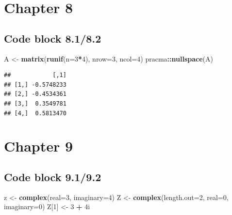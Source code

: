 \documentclass[
]{book}
\newenvironment{Shaded}{\begin{snugshade}}{\end{snugshade}}
\newcommand{\DataTypeTok}[1]{\textcolor[rgb]{0.13,0.29,0.53}{#1}}
\newcommand{\DecValTok}[1]{\textcolor[rgb]{0.00,0.00,0.81}{#1}}
\newcommand{\KeywordTok}[1]{\textcolor[rgb]{0.13,0.29,0.53}{\textbf{#1}}}
\newcommand{\NormalTok}[1]{#1}
\newcommand{\OperatorTok}[1]{\textcolor[rgb]{0.81,0.36,0.00}{\textbf{#1}}}
\newcommand{\StringTok}[1]{\textcolor[rgb]{0.31,0.60,0.02}{#1}}
\begin{document}
\hypertarget{chapter-8}{%
\section*{Chapter 8}\label{chapter-8}}

\hypertarget{code-block-8.18.2}{%
\subsection*{Code block 8.1/8.2}\label{code-block-8.18.2}}

\begin{Shaded}
\begin{Highlighting}[]
\NormalTok{A \textless{}{-}}\StringTok{ }\KeywordTok{matrix}\NormalTok{(}\KeywordTok{runif}\NormalTok{(}\DataTypeTok{n=}\DecValTok{3}\OperatorTok{*}\DecValTok{4}\NormalTok{), }\DataTypeTok{nrow=}\DecValTok{3}\NormalTok{, }\DataTypeTok{ncol=}\DecValTok{4}\NormalTok{)}
\NormalTok{pracma}\OperatorTok{::}\KeywordTok{nullspace}\NormalTok{(A)}
\end{Highlighting}
\end{Shaded}

\begin{verbatim}
##            [,1]
## [1,] -0.5748233
## [2,] -0.4534361
## [3,]  0.3549781
## [4,]  0.5813470
\end{verbatim}

\hypertarget{chapter-9}{%
\section*{Chapter 9}\label{chapter-9}}

\hypertarget{code-block-9.19.2}{%
\subsection*{Code block 9.1/9.2}\label{code-block-9.19.2}}

\begin{Shaded}
\begin{Highlighting}[]
\NormalTok{z \textless{}{-}}\StringTok{ }\KeywordTok{complex}\NormalTok{(}\DataTypeTok{real=}\DecValTok{3}\NormalTok{, }\DataTypeTok{imaginary=}\DecValTok{4}\NormalTok{)}
\NormalTok{Z \textless{}{-}}\StringTok{ }\KeywordTok{complex}\NormalTok{(}\DataTypeTok{length.out=}\DecValTok{2}\NormalTok{, }\DataTypeTok{real=}\DecValTok{0}\NormalTok{, }\DataTypeTok{imaginary=}\DecValTok{0}\NormalTok{)}
\NormalTok{Z[}\DecValTok{1}\NormalTok{] \textless{}{-}}\StringTok{ }\DecValTok{3} \OperatorTok{+}\StringTok{ }\NormalTok{4i}
\end{Highlighting}
\end{Shaded}
\end{document}
